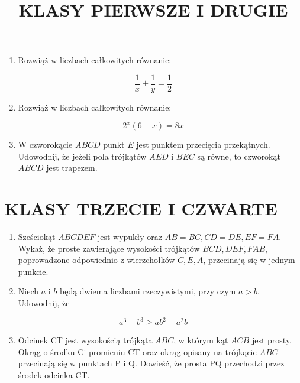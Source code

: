 \documentclass[10pt]{article}
\title{KLASY PIERWSZE I DRUGIE }
\author{}
\date{}
\begin{document}
\maketitle
\begin{enumerate}
  \item Rozwiąż w liczbach całkowitych równanie:
\end{enumerate}

\[
\frac{1}{x}+\frac{1}{y}=\frac{1}{2}
\]

\begin{enumerate}
  \setcounter{enumi}{1}
  \item Rozwiąż w liczbach całkowitych równanie:
\end{enumerate}

\[
2^{x}(6-x)=8 x
\]

\begin{enumerate}
  \setcounter{enumi}{2}
  \item W czworokącie \(A B C D\) punkt \(E\) jest punktem przecięcia przekątnych. Udowodnij, że jeżeli pola trójkątów \(A E D\) i \(B E C\) są równe, to czworokąt \(A B C D\) jest trapezem.
\end{enumerate}

\section*{KLASY TRZECIE I CZWARTE}
\begin{enumerate}
  \item Sześciokąt \(A B C D E F\) jest wypukły oraz \(A B=B C, C D=D E, E F=F A\). Wykaż, że proste zawierające wysokości trójkątów \(B C D, D E F, F A B\), poprowadzone odpowiednio z wierzchołków \(C, E, A\), przecinają się w jednym punkcie.
  \item Niech \(a\) i \(b\) będą dwiema liczbami rzeczywistymi, przy czym \(a>b\). Udowodnij, że
\end{enumerate}

\[
a^{3}-b^{3} \geq a b^{2}-a^{2} b
\]

\begin{enumerate}
  \setcounter{enumi}{2}
  \item Odcinek CT jest wysokością trójkąta \(A B C\), w którym kąt \(A C B\) jest prosty. Okrąg o środku Ci promieniu CT oraz okrąg opisany na trójkącie \(A B C\) przecinają się w punktach P i Q. Dowieść, że prosta PQ przechodzi przez środek odcinka CT.
\end{enumerate}
\end{document}
